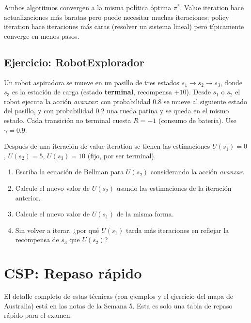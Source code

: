 \begin{remark}
    Ambos algoritmos convergen a la misma política óptima $\pi^*$. Value iteration hace actualizaciones más baratas
    pero puede necesitar muchas iteraciones; policy iteration hace iteraciones más caras (resolver un sistema lineal)
    pero típicamente converge en menos pasos.
\end{remark}

\subsection{Ejercicio: RobotExplorador}

Un robot aspiradora se mueve en un pasillo de tres estados $s_1 \to s_2 \to s_3$, donde $s_3$ es la estación de carga
(estado \textbf{terminal}, recompensa $+10$). Desde $s_1$ o $s_2$ el robot ejecuta la acción \textit{avanzar}: con
probabilidad $0.8$ se mueve al siguiente estado del pasillo, y con probabilidad $0.2$ una rueda patina y se queda en el
mismo estado. Cada transición no terminal cuesta $R = -1$ (consumo de batería). Use $\gamma = 0.9$.

Después de una iteración de value iteration se tienen las estimaciones $U(s_1) = 0$, $U(s_2) = 5$, $U(s_3) = 10$ (fijo,
por ser terminal).

\begin{enumerate}
    \item Escriba la ecuación de Bellman para $U(s_2)$ considerando la acción \textit{avanzar}.
    \item Calcule el nuevo valor de $U(s_2)$ usando las estimaciones de la iteración anterior.
    \item Calcule el nuevo valor de $U(s_1)$ de la misma forma.
    \item Sin volver a iterar, ¿por qué $U(s_1)$ tarda más iteraciones en reflejar la recompensa de $s_3$ que $U(s_2)$?
\end{enumerate}

\section{CSP: Repaso rápido}

\begin{remark}
    El detalle completo de estas técnicas (con ejemplos y el ejercicio del mapa de Australia) está en las notas de la
    Semana 5. Esta es solo una tabla de repaso rápido para el examen.
\end{remark}

